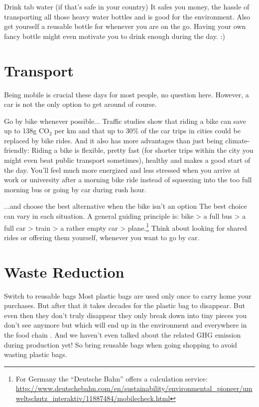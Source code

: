 \begin{suggest}{Drink tab water (if that's safe in your country)}
	It safes you money, the hassle of transporting all those heavy water bottles and is good for the environment. Also get yourself a reusable bottle for whenever you are on the go. Having your own fancy bottle might even motivate you to drink enough during the day. :)
\end{suggest}

\section{Transport}
	Being mobile is crucial these days for most people, no question here. However, a car is not the only option to get around of course.
\begin{suggest}{Go by bike whenever possible...}
	Traffic studies show that riding a bike can save up to 138g CO$_{2}$  per km and that up to 30\% of the car trips in cities could be replaced by bike rides\cite{bike}. And it also has more advantages than just being climate-friendly: Riding a bike is flexible, pretty fast (for shorter trips within the city you might even beat public transport sometimes), healthy and makes a good start of the day. You'll feel much more energized and less stressed when you arrive at work or university after a morning bike ride instead of squeezing into the too full morning bus or going by car during rush hour.
\end{suggest}

\begin{suggest}{...and choose the best alternative when the bike isn't an option}
	The best choice can vary in each situation.	A general guiding principle is: bike > a full bus > a full car > train > a rather empty car > plane.\footnote{For Germany the ``Deutsche Bahn''  offers a calculation service: \url{http://www.deutschebahn.com/en/sustainability/environmental_pioneer/umweltschutz_interaktiv/11887484/mobilecheck.html}} Think about looking for shared rides or offering them yourself, whenever you want to go by car.
\end{suggest}

\section{Waste Reduction}
\begin{suggest}{Switch to reusable bags}
	Most plastic bags are used only once to carry home your purchases. But after that it takes decades for the plastic bag to disappear. But even then they don't truly disappear they only break down into tiny pieces you don't see anymore but which will end up in the environment and everywhere in the food chain \cite{plasticbags}. And we haven't even talked about the related GHG emission during production yet! So bring reusable bags when going shopping to avoid wasting plastic bags.
\end{suggest}

